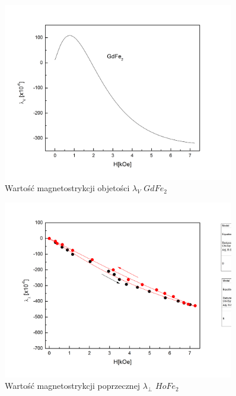 \documentclass[a4paper,12pt]{article}
\numberwithin{equation}{section}
\begin{document}
\begin{figure}[h]
    \centering
    \includegraphics[width =0.9\textwidth]{../img/magneto/GdObjetosc}
    \caption{Wartość magnetostrykcji objetości $\lambda_{V}$ $GdFe_2$}
    \label{GdObjetosc}
\end{figure}

\newpage



\clearpage
\newpage
\renewcommand{\thetable}{\Alph{section}.\arabic{table}}



\begin{figure}[h]
    \centering
    \includegraphics[width =0.9\textwidth]{../img/magneto/Hopoprzeczna}
    \caption{Wartość magnetostrykcji poprzecznej $\lambda_{\perp}$ $HoFe_2$}
    \label{Hopoprzeczna}
\end{figure}
\end{document}
